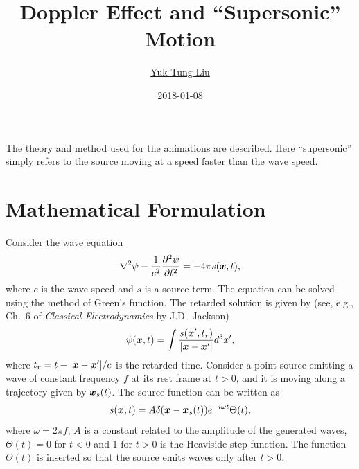 \documentclass[12pt]{article}
\newcommand \beq {\begin{equation}}
\newcommand \eeq {\end{equation}}
\newcommand{\ve}[1]{\mbox{\boldmath $#1$}}
\begin{document}
\title{Doppler Effect and ``Supersonic'' Motion}
\author{\href{https://publish.illinois.edu/ytliu/}{Yuk Tung Liu}}
\date{2018-01-08}
\maketitle

The theory and method used for the animations are described. Here ``supersonic'' 
simply refers to the source moving at a speed faster than the wave speed.

\section{Mathematical Formulation}

Consider the wave equation 
\beq
  \nabla^2 \psi - \frac{1}{c^2} \frac{\partial^2 \psi}{\partial t^2} 
= -4\pi s(\ve{x},t) ,
\label{eq:wave}
\eeq
where $c$ is the wave speed and $s$ is a source term. The equation can be 
solved using the method of Green's function. The retarded solution 
is given by (see, e.g., Ch.~6 of 
{\it Classical Electrodynamics} by J.D.~Jackson) 
\beq
  \psi(\ve{x},t) = \int \frac{s(\ve{x}',t_r)}{|\ve{x}-\ve{x}'|} d^3 x' ,
\label{eq:psi_solution}
\eeq
where $t_r = t-|\ve{x}-\ve{x}'|/c$ is the retarded time. Consider a point 
source emitting a wave of constant frequency $f$ at its rest frame at 
$t > 0$, and it is moving along a trajectory given by $\ve{x}_s(t)$. 
The source function can be written as 
\beq
  s(\ve{x},t) = A \delta(\ve{x}-\ve{x}_s(t)) e^{-i\omega t} \Theta(t) ,
\label{eq:f}
\eeq
where $\omega = 2\pi f$, $A$ is a constant related to the amplitude of the 
generated waves, $\Theta(t)=0$ for $t<0$ and 1 for $t>0$ is 
the Heaviside step function. The function $\Theta(t)$ is inserted so that 
the source emits waves only after $t>0$.
\end{document}
